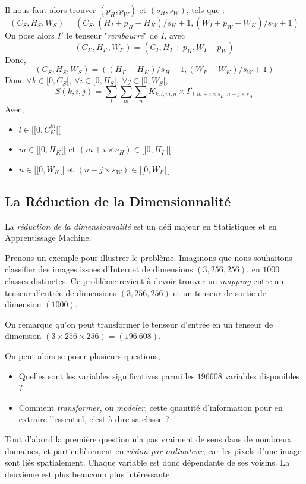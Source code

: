 \documentclass[a4paper, 11pt]{report}
\begin{document}
Il nous faut alors trouver $(p_H, p_W)$ et $(s_H, s_W)$, tels que :
$$(C_S, H_S, W_S) = (C_S, (H_I + p_H - H_K) / s_H + 1, (W_I + p_W - W_K) / s_W + 1)$$
On pose alors $I'$ le tenseur "\emph{rembourré}" de $I$, avec 
$$(C_{I'}, H_{I'}, W_{I'}) = (C_I, H_I + p_H, W_I + p_W)$$
Donc,
$$(C_S, H_S, W_S) = ((H_{I'} - H_K) / s_H + 1, (W_{I'} - W_K) / s_W + 1)$$
Donc $\forall k \in [0, C_S[, \ \forall i \in [0, H_S[, \ \forall j \in [0, W_S[$,
$$S(k, i, j) = \sum_{l}\sum_{m}\sum_{n}{K_{k, l, m, n} \times {I'}_{l, m + i \times s_H, n + j \times s_W}}$$
Avec,
\begin{itemize}
	\item $l \in [\![0, C_K^{in}[\![$
	\item $m \in [\![0, H_K[\![$ et $(m + i \times s_H) \in [\![0, H_{I'}[\![$
	\item $n \in [\![0, W_K[\![$ et $(n + j \times s_W) \in [\![0, W_{I'}[\![$
\end{itemize}
\subsection{La Réduction de la Dimensionnalité}
La \emph{réduction de la dimensionnalité} est un défi majeur en Statistiques et en Apprentissage Machine.

Prenons un exemple pour illustrer le problème.
Imaginons que nous souhaitons classifier des images issues d'Internet de dimensions $(3,256,256)$, en $1000$ classes distinctes.
Ce problème revient à devoir trouver un \emph{mapping} entre un tenseur d'entrée de dimensions $(3, 256, 256)$ et un tenseur de sortie de dimension $(1000)$.

On remarque qu'on peut transformer le tenseur d'entrée en un tenseur de dimension $(3 \times 256 \times 256) = (196\ 608)$.

On peut alors se poser plusieurs questions,
\begin{itemize}
	\item Quelles sont les variables significatives parmi les $196608$ variables disponibles ?
	\item Comment \emph{transformer}, ou \emph{modeler}, cette quantité d'information pour en extraire l'essentiel, c'est à dire sa classe ?
\end{itemize}

Tout d'abord la première question n'a pas vraiment de sens dans de nombreux domaines, et particulièrement en \emph{vision par ordinateur}, car les pixels d'une image sont liés spatialement. Chaque variable est donc dépendante de ses voisins.
La deuxième est plus beaucoup plus intéressante.
\end{document}
